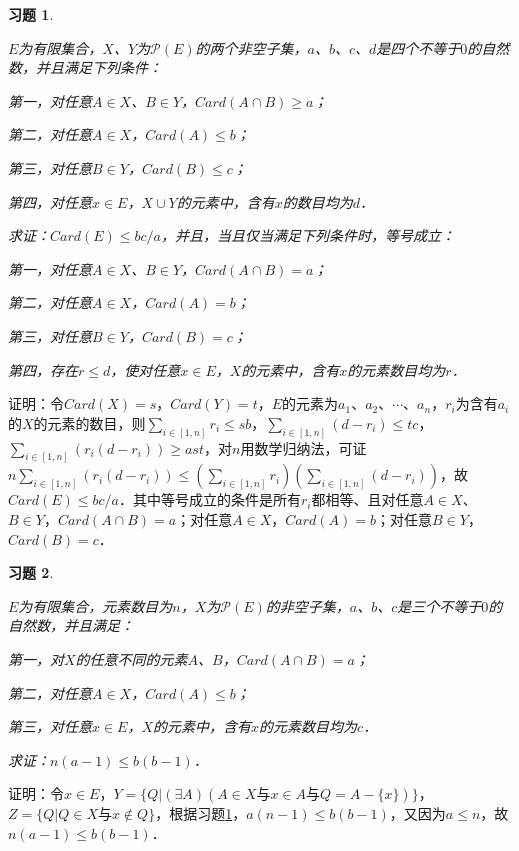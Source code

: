 \documentclass[12pt, a4paper, oneside]{book}
\newtheorem{exer}{习题}
\begin{document}
			\begin{exer}\label{exer152}
				\hfill\par
				$E$为有限集合，$X$、$Y$为$\mathcal{P}(E)$的两个非空子集，$a$、$b$、$c$、$d$是四个不等于$0$的自然数，并且满足下列条件：
				\par
				第一，对任意$A\in X$、$B\in Y$，$Card(A\cap B)\geq a$；
				\par
				第二，对任意$A\in X$，$Card(A)\leq b$；
				\par
				第三，对任意$B\in Y$，$Card(B)\leq c$；
				\par
				第四，对任意$x\in E$，$X\cup Y$的元素中，含有$x$的数目均为$d$．
				\par
				求证：$Card(E)\leq bc/a$，并且，当且仅当满足下列条件时，等号成立：
				\par
				第一，对任意$A\in X$、$B\in Y$，$Card(A\cap B)=a$；
				\par
				第二，对任意$A\in X$，$Card(A)=b$；
				\par
				第三，对任意$B\in Y$，$Card(B)=c$；
				\par
				第四，存在$r\leq d$，使对任意$x\in E$，$X$的元素中，含有$x$的元素数目均为$r$．
			\end{exer}
			证明：令$Card(X)=s$，$Card(Y)=t$，$E$的元素为$a_1$、$a_2$、$\cdots$、$a_n$，$r_i$为含有$a_i$的$X$的元素的数目，则$\sum\limits_{i\in [1, n]}r_i\leq sb$，$\sum\limits_{i\in [1, n]}(d-r_i)\leq tc$，$\sum\limits_{i\in [1, n]}(r_i(d-r_i))\geq ast$，对$n$用数学归纳法，可证$n\sum\limits_{i\in [1, n]}(r_i(d-r_i))\leq (\sum\limits_{i\in [1, n]}r_i)(\sum\limits_{i\in [1, n]}(d-r_i))$，故$Card(E)\leq bc/a$．其中等号成立的条件是所有$r_i$都相等、且对任意$A\in X$、$B\in Y$，$Card(A\cap B)=a$；对任意$A\in X$，$Card(A)=b$；对任意$B\in Y$，$Card(B)=c$．
			
			\begin{exer}\label{exer153}
				\hfill\par
				$E$为有限集合，元素数目为$n$，$X$为$\mathcal{P}(E)$的非空子集，$a$、$b$、$c$是三个不等于$0$的自然数，并且满足：
				\par
				第一，对$X$的任意不同的元素$A$、$B$，$Card(A\cap B)=a$；
				\par
				第二，对任意$A\in X$，$Card(A)\leq b$；
				\par
				第三，对任意$x\in E$，$X$的元素中，含有$x$的元素数目均为$c$．
				\par
				求证：$n(a-1)\leq b(b-1)$．
			\end{exer}
			证明：令$x\in E$，$Y=\{Q|(\exists A)(A\in X\text{与}x\in A\text{与}Q=A-\{x\})\}$，$Z=\{Q|Q\in X\text{与}x\notin Q\}$，根据习题\ref{exer152}，$a(n-1) \leq b(b-1)$，又因为$a\leq n$，故$n(a-1)\leq b(b-1)$．
						
\end{document}
